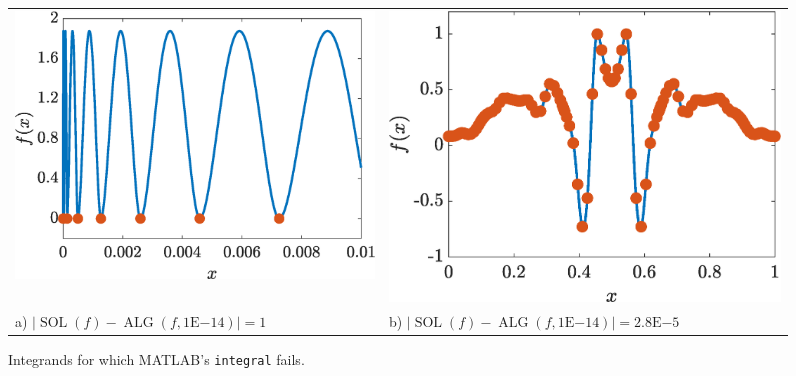 \documentclass[11pt]{NSFamsart}
\DeclareMathOperator{\SOL}{SOL}
\DeclareMathOperator{\ALG}{ALG}
\def\abs#1{\ensuremath{\left \lvert #1 \right \rvert}}
\begin{document}
\newlength{\figwidthA}
\setlength{\figwidthA}{0.45\textwidth}
\begin{figure}[h]
	\begin{tabular}{>{\centering}m{\figwidthA}@{\qquad}>{\centering}m{\figwidthA}}
		\includegraphics[width=\figwidthA]{ProgramsImages/SpikyFoolIntegralcolor.eps} &
		\includegraphics[width=\figwidthA]{ProgramsImages/FlukyFoolIntegralcolor.eps} 
		\tabularnewline
		a) $\abs{\SOL(f) - \ALG(f,1\text{E}{-14})} = 1 $ &
		b) $\abs{\SOL(f) - \ALG(f,1\text{E}{-14})} =  2.8\text{E}{-5}$
		\end{tabular}
	\caption{Integrands for which MATLAB's \texttt{integral} fails. \label{quadfailfig}}
\end{figure}
\end{document}
